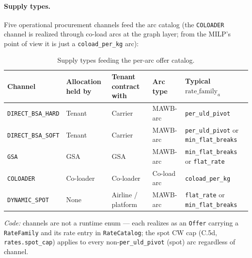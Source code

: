 \documentclass[11pt,a4paper]{article}
\theoremstyle{definition}
\begin{document}
\paragraph{Supply types.}
Five operational procurement channels feed the arc catalog (the
\texttt{COLOADER} channel is realized through co-load arcs at the graph
layer; from the MILP's point of view it is just a \texttt{coload\_per\_kg}
arc):
\begin{table}[H]
\centering
\caption{Supply types feeding the per-arc offer catalog.}
\label{tab:supply-types}
\begin{tabular}{p{2.5cm}p{2.0cm}p{2.0cm}p{2.5cm}p{4.5cm}}
\toprule
Channel & Allocation held by & Tenant contract with & Arc type & Typical $\text{rate\_family}_a$ \\
\midrule
\texttt{DIRECT\_BSA\_HARD} & Tenant & Carrier & MAWB-arc & \texttt{per\_uld\_pivot} \\
\texttt{DIRECT\_BSA\_SOFT} & Tenant & Carrier & MAWB-arc & \texttt{per\_uld\_pivot} or \texttt{min\_flat\_breaks} \\
\texttt{GSA} & GSA & GSA & MAWB-arc & \texttt{min\_flat\_breaks} or \texttt{flat\_rate} \\
\texttt{COLOADER} & Co-loader & Co-loader & Co-load arc & \texttt{coload\_per\_kg} \\
\texttt{DYNAMIC\_SPOT} & None & Airline / platform & MAWB-arc & \texttt{flat\_rate} or \texttt{min\_flat\_breaks} \\
\bottomrule
\end{tabular}
\end{table}
\emph{Code:} channels are not a runtime enum --- each realizes as an \texttt{Offer} carrying a
\texttt{RateFamily} and its rate entry in \texttt{RateCatalog}; the spot CW cap (C.5d,
\texttt{rates.spot\_cap}) applies to every non-\texttt{per\_uld\_pivot} (spot) arc regardless of channel.
\end{document}
